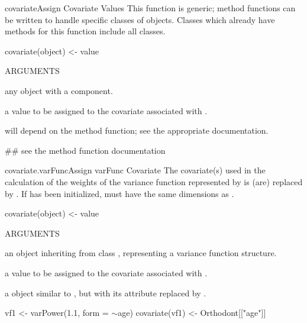 \documentclass[pdftex]{article} \usepackage{url,graphicx}
\renewcommand{\Twiddle}{\mbox{\(\sim\)}}
\begin{document}
\begin{Helpfile}{covariate\Co{<-}}{Assign Covariate Values}
This function is generic; method functions can be written to handle
specific classes of objects. Classes which already have methods for
this function include all  classes.
\begin{Example}
covariate(object) <- value
\end{Example}
\begin{Argument}{ARGUMENTS}
\item[\Co{object:}]
any object with a  component.
\item[\Co{value:}]
a value to be assigned to the covariate associated with
.
\end{Argument}
will depend on the method function; see the appropriate documentation.
\need 15pt
\vspace{-16pt} 
\begin{Example}
## see the method function documentation
\end{Example}
\end{Helpfile}
\begin{Helpfile}{covariate\Co{<-}.varFunc}{Assign varFunc Covariate}
The covariate(s) used in the calculation of the weights of the
variance function represented by  is (are) replaced by
. If  has been initialized,  must
have the same dimensions as .
\begin{Example}
covariate(object) <- value
\end{Example}
\begin{Argument}{ARGUMENTS}
\item[\Co{object:}]
an object inheriting from class ,
representing a variance function structure.
\item[\Co{value:}]
a value to be assigned to the covariate associated with
.
\end{Argument}
a  object similar to , but with its
 attribute replaced by .
\need 15pt
\vspace{-16pt} 
\begin{Example}
vf1 <- varPower(1.1, form = \Twiddle age)
covariate(vf1) <- Orthodont[["age"]]
\end{Example}
\end{Helpfile}
\end{document}
